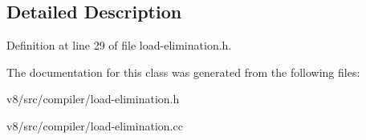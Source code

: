 \subsection{Detailed Description}


Definition at line 29 of file load-\/elimination.\+h.



The documentation for this class was generated from the following files\+:\begin{DoxyCompactItemize}
\item 
v8/src/compiler/load-\/elimination.\+h\item 
v8/src/compiler/load-\/elimination.\+cc\end{DoxyCompactItemize}
